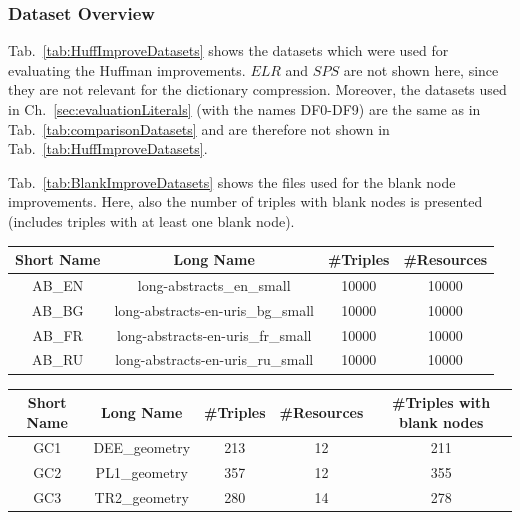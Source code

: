 \subsubsection{Dataset Overview}

Tab.~\ref{tab:HuffImproveDatasets} shows the datasets which were used for evaluating the Huffman improvements. $ELR$ and $SPS$ are not shown here, since they are not relevant for the dictionary compression. Moreover, the datasets used in Ch.~\ref{sec:evaluationLiterals} (with the names DF0-DF9) are the same as in Tab.~\ref{tab:comparisonDatasets} and are therefore not shown in Tab.~\ref{tab:HuffImproveDatasets}.

Tab.~\ref{tab:BlankImproveDatasets} shows the files used for the blank node improvements. Here, also the number of triples with blank nodes is presented (includes triples with at least one blank node).

\begin{center}
	\begin{tabular}{|c|c|c|c|}
		\hline 
		Short Name & Long Name & \#Triples & \#Resources \\ 
		\hline
		AB\_EN & long-abstracts\_en\_small & 10000 & 10000 \\
		\hline
		AB\_BG & long-abstracts-en-uris\_bg\_small & 10000 & 10000  \\
		\hline
		AB\_FR & long-abstracts-en-uris\_fr\_small & 10000 & 10000 \\
		\hline
		AB\_RU & long-abstracts-en-uris\_ru\_small & 10000 & 10000 \\
		\hline
	\end{tabular} 
	\label{tab:HuffImproveDatasets}
\end{center}

\begin{center}
	\begin{tabular}{|c|c|c|c|c|}
		\hline 
		Short Name & Long Name & \#Triples & \#Resources & \#Triples with blank nodes \\ 
		\hline
		GC1 & DEE\_geometry & 213 & 12 & 211 \\
		\hline
		GC2 & PL1\_geometry & 357 & 12 & 355 \\
		\hline
		GC3 & TR2\_geometry & 280 & 14 & 278 \\
		\hline
	\end{tabular} 
	\label{tab:BlankImproveDatasets}
\end{center}



